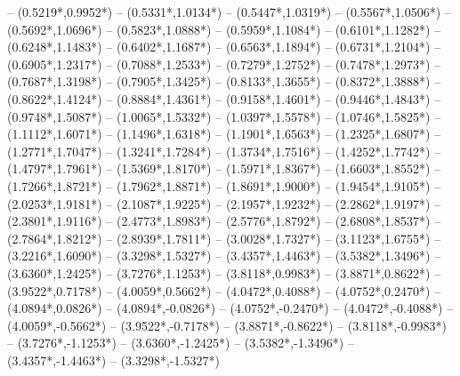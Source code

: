 {	-- ({0.5219*\dx},{0.9952*\dy})
	-- ({0.5331*\dx},{1.0134*\dy})
	-- ({0.5447*\dx},{1.0319*\dy})
	-- ({0.5567*\dx},{1.0506*\dy})
	-- ({0.5692*\dx},{1.0696*\dy})
	-- ({0.5823*\dx},{1.0888*\dy})
	-- ({0.5959*\dx},{1.1084*\dy})
	-- ({0.6101*\dx},{1.1282*\dy})
	-- ({0.6248*\dx},{1.1483*\dy})
	-- ({0.6402*\dx},{1.1687*\dy})
	-- ({0.6563*\dx},{1.1894*\dy})
	-- ({0.6731*\dx},{1.2104*\dy})
	-- ({0.6905*\dx},{1.2317*\dy})
	-- ({0.7088*\dx},{1.2533*\dy})
	-- ({0.7279*\dx},{1.2752*\dy})
	-- ({0.7478*\dx},{1.2973*\dy})
	-- ({0.7687*\dx},{1.3198*\dy})
	-- ({0.7905*\dx},{1.3425*\dy})
	-- ({0.8133*\dx},{1.3655*\dy})
	-- ({0.8372*\dx},{1.3888*\dy})
	-- ({0.8622*\dx},{1.4124*\dy})
	-- ({0.8884*\dx},{1.4361*\dy})
	-- ({0.9158*\dx},{1.4601*\dy})
	-- ({0.9446*\dx},{1.4843*\dy})
	-- ({0.9748*\dx},{1.5087*\dy})
	-- ({1.0065*\dx},{1.5332*\dy})
	-- ({1.0397*\dx},{1.5578*\dy})
	-- ({1.0746*\dx},{1.5825*\dy})
	-- ({1.1112*\dx},{1.6071*\dy})
	-- ({1.1496*\dx},{1.6318*\dy})
	-- ({1.1901*\dx},{1.6563*\dy})
	-- ({1.2325*\dx},{1.6807*\dy})
	-- ({1.2771*\dx},{1.7047*\dy})
	-- ({1.3241*\dx},{1.7284*\dy})
	-- ({1.3734*\dx},{1.7516*\dy})
	-- ({1.4252*\dx},{1.7742*\dy})
	-- ({1.4797*\dx},{1.7961*\dy})
	-- ({1.5369*\dx},{1.8170*\dy})
	-- ({1.5971*\dx},{1.8367*\dy})
	-- ({1.6603*\dx},{1.8552*\dy})
	-- ({1.7266*\dx},{1.8721*\dy})
	-- ({1.7962*\dx},{1.8871*\dy})
	-- ({1.8691*\dx},{1.9000*\dy})
	-- ({1.9454*\dx},{1.9105*\dy})
	-- ({2.0253*\dx},{1.9181*\dy})
	-- ({2.1087*\dx},{1.9225*\dy})
	-- ({2.1957*\dx},{1.9232*\dy})
	-- ({2.2862*\dx},{1.9197*\dy})
	-- ({2.3801*\dx},{1.9116*\dy})
	-- ({2.4773*\dx},{1.8983*\dy})
	-- ({2.5776*\dx},{1.8792*\dy})
	-- ({2.6808*\dx},{1.8537*\dy})
	-- ({2.7864*\dx},{1.8212*\dy})
	-- ({2.8939*\dx},{1.7811*\dy})
	-- ({3.0028*\dx},{1.7327*\dy})
	-- ({3.1123*\dx},{1.6755*\dy})
	-- ({3.2216*\dx},{1.6090*\dy})
	-- ({3.3298*\dx},{1.5327*\dy})
	-- ({3.4357*\dx},{1.4463*\dy})
	-- ({3.5382*\dx},{1.3496*\dy})
	-- ({3.6360*\dx},{1.2425*\dy})
	-- ({3.7276*\dx},{1.1253*\dy})
	-- ({3.8118*\dx},{0.9983*\dy})
	-- ({3.8871*\dx},{0.8622*\dy})
	-- ({3.9522*\dx},{0.7178*\dy})
	-- ({4.0059*\dx},{0.5662*\dy})
	-- ({4.0472*\dx},{0.4088*\dy})
	-- ({4.0752*\dx},{0.2470*\dy})
	-- ({4.0894*\dx},{0.0826*\dy})
	-- ({4.0894*\dx},{-0.0826*\dy})
	-- ({4.0752*\dx},{-0.2470*\dy})
	-- ({4.0472*\dx},{-0.4088*\dy})
	-- ({4.0059*\dx},{-0.5662*\dy})
	-- ({3.9522*\dx},{-0.7178*\dy})
	-- ({3.8871*\dx},{-0.8622*\dy})
	-- ({3.8118*\dx},{-0.9983*\dy})
	-- ({3.7276*\dx},{-1.1253*\dy})
	-- ({3.6360*\dx},{-1.2425*\dy})
	-- ({3.5382*\dx},{-1.3496*\dy})
	-- ({3.4357*\dx},{-1.4463*\dy})
	-- ({3.3298*\dx},{-1.5327*\dy})
}
